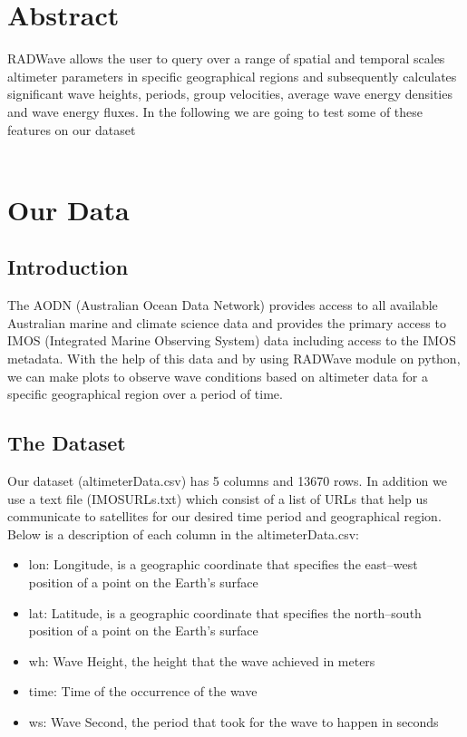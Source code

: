 \documentclass[12pt]{article}
\begin{document}
\newpage

{
  \section*{Abstract}
}
RADWave allows the user to query over a range of spatial and temporal scales altimeter parameters in specific geographical regions and subsequently calculates significant wave heights, periods, group velocities, average wave energy densities and wave energy fluxes. In the following we are going to test some of these features on our dataset \\\\

\section{Our Data}
\subsection{Introduction}
The AODN (Australian Ocean Data Network) provides access to all available Australian marine and climate science data and provides the primary access to IMOS (Integrated Marine Observing System) data including access to the IMOS metadata. With the help of this data and by using RADWave module on python, we can make plots to observe wave conditions based on altimeter data for a specific geographical region over a period of time.
\subsection{The Dataset}
Our dataset (altimeterData.csv) has 5 columns and 13670 rows. In addition we use a text file (IMOSURLs.txt) which consist of a list of URLs that help us communicate to satellites for our desired time period and geographical region. Below is a description of each column in the altimeterData.csv: 

\begin{itemize}

\item lon: Longitude, is a geographic coordinate that specifies the east–west position of a point on the Earth's surface
\item lat: Latitude, is a geographic coordinate that specifies the north–south position of a point on the Earth's surface
\item wh: Wave Height, the height that the wave achieved in meters 
\item time: Time of the occurrence of the wave
\item ws: Wave Second, the period that took for the wave to happen in seconds

\end{itemize}
\end{document}

